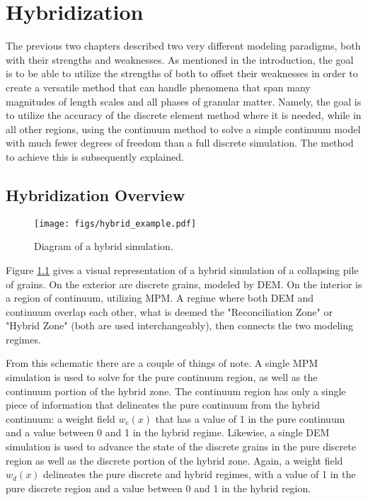 \newcommand{\pluseq}{\mathrel{{+}{=}}}
\chapter{Hybridization}
The previous two chapters described two very different modeling paradigms, both with their strengths and weaknesses. As mentioned in the introduction, the goal is to be able to utilize the strengths of both to offset their weaknesses in order to create a versatile method that can handle phenomena that span many magnitudes of length scales and all phases of granular matter. Namely, the goal is to utilize the accuracy of the discrete element method where it is needed, while in all other regions, using the continuum method to solve a simple continuum model with much fewer degrees of freedom than a full discrete simulation. The method to achieve this is subsequently explained.

\section{Hybridization Overview}
\begin{figure}[htp] 
    \centering
    \texttt{[image: figs/hybrid\_example.pdf]}
    \caption{Diagram of a hybrid simulation.}
    \label{hybrid_diagram}
\end{figure}

Figure \ref{hybrid_diagram} gives a visual representation of a hybrid simulation of a collapsing pile of grains. On the exterior are discrete grains, modeled by DEM. On the interior is a region of continuum, utilizing MPM. A regime where both DEM and continuum overlap each other, what is deemed the "Reconciliation Zone" or "Hybrid Zone" (both are used interchangeably), then connects the two modeling regimes.

From this schematic there are a couple of things of note. A single MPM simulation is used to solve for the pure continuum region, as well as the continuum portion of the hybrid zone. The continuum region has only a single piece of information that delineates the pure continuum from the hybrid continuum: a weight field $w_c(x)$ that has a value of 1 in the pure continuum and a value between 0 and 1 in the hybrid regime. Likewise, a single DEM simulation is used to advance the state of the discrete grains in the pure discrete region as well as the discrete portion of the hybrid zone. Again, a weight field $w_d(x)$ delineates the pure discrete and hybrid regimes, with a value of 1 in the pure discrete region and a value between 0 and 1 in the hybrid region.

